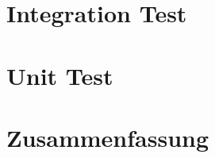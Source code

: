 \documentclass[a4paper,bibtotoc,oneside]{scrbook}
\begin{document}

\chapter{Integration Test}
\chapter{Unit Test}
\chapter{Zusammenfassung}


\end{document}
